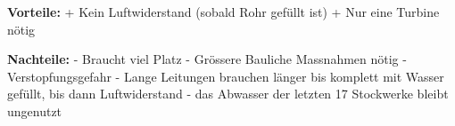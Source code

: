 \textbf{Vorteile:} 									\newline
+	Kein Luftwiderstand (sobald Rohr gefüllt ist)	\newline
+	Nur eine Turbine nötig							\newline

\textbf{Nachteile:}									\newline
-	Braucht viel Platz 								\newline
-	Grössere Bauliche Massnahmen nötig				\newline
-	Verstopfungsgefahr 								\newline
-	Lange Leitungen brauchen länger bis komplett mit Wasser gefüllt, bis dann Luftwiderstand
-	das Abwasser der letzten 17 Stockwerke bleibt ungenutzt